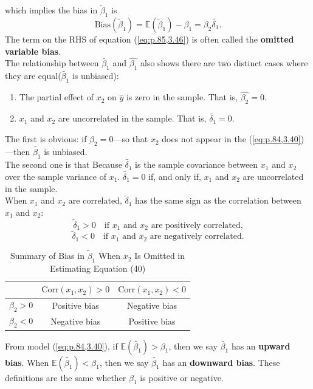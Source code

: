 \documentclass[a4paper, 10pt]{article}
\theoremstyle{definition}	%
\begin{document}
which implies the bias in \(\tilde{\beta}_1\) is
\begin{equation}
    \text{Bias}(\tilde{\beta}_1) = \mathbb{E}(\tilde{\beta}_1) - \beta_1 = \beta_2 \tilde{\delta_1}. \label{eq:p.85,3.46}
\end{equation}
The term on the RHS of equation (\ref{eq:p.85,3.46}) is often called the \textbf{omitted variable bias}.\\
The relationship between $\tilde{\beta_1}$ and $\hat{\beta_1}$ also shows there are two distinct cases where they are equal($\tilde{\beta_1}$ is unbiased):
\begin{enumerate}
    \item The partial effect of $x_2$ on $\hat{y}$ is zero in the sample. That is, $\hat{\beta_2} = 0$.
    \item $x_1$ and $x_2$ are uncorrelated in the sample. That is, $\tilde{\delta_1} = 0$.
\end{enumerate}
The first is obvious: if $\beta_2 = 0$---so that $x_2$ does not appear in the (\ref{eq:p.84,3.40})---then $\tilde{\beta_1}$ is unbiased.\\ 
The second one is that Because $\tilde{\delta_1}$ is the sample covariance between $x_1$ and $x_2$ over the sample variance of $x_1$. $\tilde{\delta_1} = 0$ if, and only if, $x_1$ and $x_2$ are uncorrelated in the sample.\\
When \(x_1\) and \(x_2\) are correlated, \(\tilde{\delta}_1\) has the same sign as the correlation between \(x_1\) and \(x_2\):
\[
\tilde{\delta}_1 > 0 \quad \text{if } x_1 \text{ and } x_2 \text{ are positively correlated,}
\]
\[
\tilde{\delta}_1 < 0 \quad \text{if } x_1 \text{ and } x_2 \text{ are negatively correlated.}
\]

\begin{table}[h!]
\centering
\renewcommand{\arraystretch}{1.5} %
\setlength{\tabcolsep}{10pt}     %
\begin{tabular}{|c|c|c|}
\hline
\textbf{ } & \(\text{Corr}(x_1, x_2) > 0\) & \(\text{Corr}(x_1, x_2) < 0\) \\ \hline
\(\beta_2 > 0\) & Positive bias & Negative bias \\ \hline
\(\beta_2 < 0\) & Negative bias & Positive bias \\ \hline
\end{tabular}
\caption{Summary of Bias in \(\tilde{\beta}_1\) When \(x_2\) Is Omitted in Estimating Equation (40)}
\end{table}
From model (\ref{eq:p.84,3.40}), if $\mathbb{E}(\tilde{\beta_1}) > \beta_1$, then we say $\tilde{\beta_1}$ has an \textbf{upward bias}. When $\mathbb{E}(\tilde{\beta_1}) < \beta_1$, then we say $\tilde{\beta_1}$ has an \textbf{downward bias}. These definitions are the same whether $\beta_1$ is positive or negative.
\end{document}

